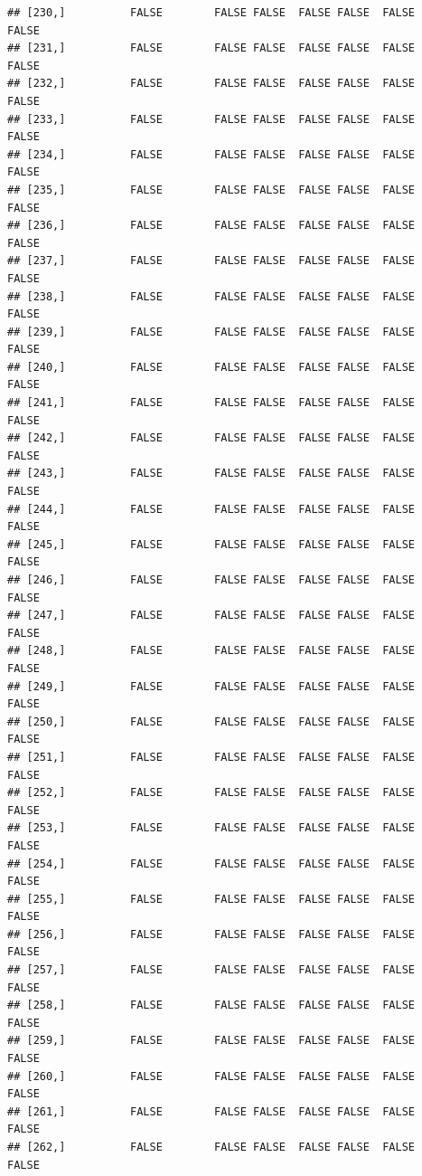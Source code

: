 \documentclass[
  english,
  man,floatsintext]{apa6}
\begin{document}
\begin{verbatim}
## [230,]          FALSE        FALSE FALSE  FALSE FALSE  FALSE            FALSE
## [231,]          FALSE        FALSE FALSE  FALSE FALSE  FALSE            FALSE
## [232,]          FALSE        FALSE FALSE  FALSE FALSE  FALSE            FALSE
## [233,]          FALSE        FALSE FALSE  FALSE FALSE  FALSE            FALSE
## [234,]          FALSE        FALSE FALSE  FALSE FALSE  FALSE            FALSE
## [235,]          FALSE        FALSE FALSE  FALSE FALSE  FALSE            FALSE
## [236,]          FALSE        FALSE FALSE  FALSE FALSE  FALSE            FALSE
## [237,]          FALSE        FALSE FALSE  FALSE FALSE  FALSE            FALSE
## [238,]          FALSE        FALSE FALSE  FALSE FALSE  FALSE            FALSE
## [239,]          FALSE        FALSE FALSE  FALSE FALSE  FALSE            FALSE
## [240,]          FALSE        FALSE FALSE  FALSE FALSE  FALSE            FALSE
## [241,]          FALSE        FALSE FALSE  FALSE FALSE  FALSE            FALSE
## [242,]          FALSE        FALSE FALSE  FALSE FALSE  FALSE            FALSE
## [243,]          FALSE        FALSE FALSE  FALSE FALSE  FALSE            FALSE
## [244,]          FALSE        FALSE FALSE  FALSE FALSE  FALSE            FALSE
## [245,]          FALSE        FALSE FALSE  FALSE FALSE  FALSE            FALSE
## [246,]          FALSE        FALSE FALSE  FALSE FALSE  FALSE            FALSE
## [247,]          FALSE        FALSE FALSE  FALSE FALSE  FALSE            FALSE
## [248,]          FALSE        FALSE FALSE  FALSE FALSE  FALSE            FALSE
## [249,]          FALSE        FALSE FALSE  FALSE FALSE  FALSE            FALSE
## [250,]          FALSE        FALSE FALSE  FALSE FALSE  FALSE            FALSE
## [251,]          FALSE        FALSE FALSE  FALSE FALSE  FALSE            FALSE
## [252,]          FALSE        FALSE FALSE  FALSE FALSE  FALSE            FALSE
## [253,]          FALSE        FALSE FALSE  FALSE FALSE  FALSE            FALSE
## [254,]          FALSE        FALSE FALSE  FALSE FALSE  FALSE            FALSE
## [255,]          FALSE        FALSE FALSE  FALSE FALSE  FALSE            FALSE
## [256,]          FALSE        FALSE FALSE  FALSE FALSE  FALSE            FALSE
## [257,]          FALSE        FALSE FALSE  FALSE FALSE  FALSE            FALSE
## [258,]          FALSE        FALSE FALSE  FALSE FALSE  FALSE            FALSE
## [259,]          FALSE        FALSE FALSE  FALSE FALSE  FALSE            FALSE
## [260,]          FALSE        FALSE FALSE  FALSE FALSE  FALSE            FALSE
## [261,]          FALSE        FALSE FALSE  FALSE FALSE  FALSE            FALSE
## [262,]          FALSE        FALSE FALSE  FALSE FALSE  FALSE            FALSE

\end{verbatim}
\end{document}
